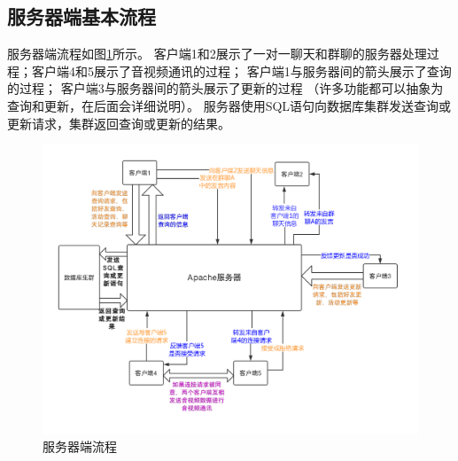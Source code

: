     \subsection{服务器端基本流程}
    服务器端流程如图\ref{fig:server_flow}所示。
    客户端1和2展示了一对一聊天和群聊的服务器处理过程；客户端4和5展示了音视频通讯的过程；
    客户端1与服务器间的箭头展示了查询的过程；
    客户端3与服务器间的箭头展示了更新的过程
    （许多功能都可以抽象为查询和更新，在后面会详细说明）。
    服务器使用SQL语句向数据库集群发送查询或更新请求，集群返回查询或更新的结果。
        \begin{figure}[h]
            \centering
            \includegraphics[scale=0.4]{OutlineDesign/figures/server_flow.png}
            \caption{服务器端流程}
            \label{fig:server_flow}
        \end{figure}
